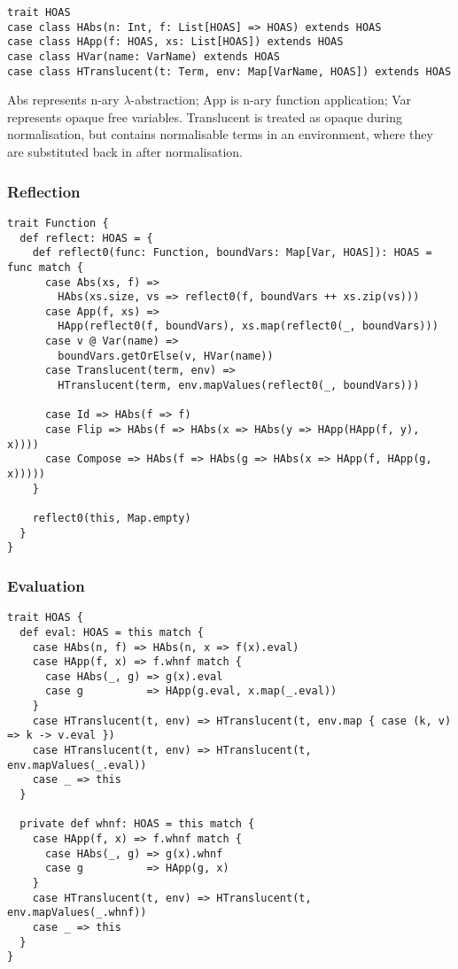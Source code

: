 \documentclass[../../main.tex]{subfiles}
\begin{document}
\begin{verbatim}
trait HOAS
case class HAbs(n: Int, f: List[HOAS] => HOAS) extends HOAS
case class HApp(f: HOAS, xs: List[HOAS]) extends HOAS
case class HVar(name: VarName) extends HOAS
case class HTranslucent(t: Term, env: Map[VarName, HOAS]) extends HOAS
\end{verbatim}
%
Abs represents n-ary $\lambda$-abstraction; App is n-ary function application; Var represents opaque free variables.
Translucent is treated as opaque during normalisation, but contains normalisable terms in an environment, where they are substituted back in after normalisation.

\subsubsection{Reflection}

\begin{verbatim}
trait Function {
  def reflect: HOAS = {
    def reflect0(func: Function, boundVars: Map[Var, HOAS]): HOAS = func match {
      case Abs(xs, f) =>
        HAbs(xs.size, vs => reflect0(f, boundVars ++ xs.zip(vs)))
      case App(f, xs) =>
        HApp(reflect0(f, boundVars), xs.map(reflect0(_, boundVars)))
      case v @ Var(name) =>
        boundVars.getOrElse(v, HVar(name))
      case Translucent(term, env) =>
        HTranslucent(term, env.mapValues(reflect0(_, boundVars)))

      case Id => HAbs(f => f)
      case Flip => HAbs(f => HAbs(x => HAbs(y => HApp(HApp(f, y), x))))
      case Compose => HAbs(f => HAbs(g => HAbs(x => HApp(f, HApp(g, x)))))
    }

    reflect0(this, Map.empty)
  }
}
\end{verbatim}

\subsubsection{Evaluation}
\begin{verbatim}
trait HOAS {
  def eval: HOAS = this match {
    case HAbs(n, f) => HAbs(n, x => f(x).eval)
    case HApp(f, x) => f.whnf match {
      case HAbs(_, g) => g(x).eval
      case g          => HApp(g.eval, x.map(_.eval))
    }
    case HTranslucent(t, env) => HTranslucent(t, env.map { case (k, v) => k -> v.eval })
    case HTranslucent(t, env) => HTranslucent(t, env.mapValues(_.eval))
    case _ => this
  }

  private def whnf: HOAS = this match {
    case HApp(f, x) => f.whnf match {
      case HAbs(_, g) => g(x).whnf
      case g          => HApp(g, x)
    }
    case HTranslucent(t, env) => HTranslucent(t, env.mapValues(_.whnf))
    case _ => this
  }
}
\end{verbatim}
\end{document}
